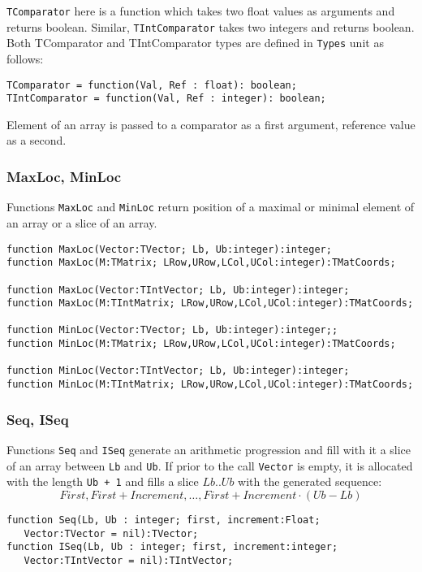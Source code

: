 \documentclass[12pt,a4paper,oneside]{article}
\newcommand{\code}[1]{\texttt{#1}}
\begin{document}
\code{TComparator} here is a function which takes two float values as arguments and returns boolean. Similar, \code{TIntComparator} takes two integers and returns boolean. Both TComparator and TIntComparator types are defined in \code{Types} unit as follows:
\begin{verbatim}
TComparator = function(Val, Ref : float): boolean;
TIntComparator = function(Val, Ref : integer): boolean;
\end{verbatim}
Element of an array is passed to a comparator as a first argument, reference value as a second.
\subsubsection{MaxLoc, MinLoc}
Functions \code{MaxLoc} and \code{MinLoc} return position of a maximal or minimal element of an array or a slice of an array.
\begin{verbatim}
function MaxLoc(Vector:TVector; Lb, Ub:integer):integer;
function MaxLoc(M:TMatrix; LRow,URow,LCol,UCol:integer):TMatCoords;

function MaxLoc(Vector:TIntVector; Lb, Ub:integer):integer;
function MaxLoc(M:TIntMatrix; LRow,URow,LCol,UCol:integer):TMatCoords;

function MinLoc(Vector:TVector; Lb, Ub:integer):integer;;
function MinLoc(M:TMatrix; LRow,URow,LCol,UCol:integer):TMatCoords;

function MinLoc(Vector:TIntVector; Lb, Ub:integer):integer;
function MinLoc(M:TIntMatrix; LRow,URow,LCol,UCol:integer):TMatCoords;
\end{verbatim}
\subsubsection{Seq, ISeq}
Functions \code{Seq} and \code{ISeq} generate an arithmetic progression and fill with it a slice of an array between \code{Lb} and \code{Ub}. If prior to the call \code{Vector} is empty, it is allocated with the length \code{Ub + 1} and fills a slice $Lb..Ub$ with the generated sequence:
$$
 First, First + Increment, \dots, First + Increment \cdot (Ub-Lb)  
$$
\begin{verbatim}
function Seq(Lb, Ub : integer; first, increment:Float; 
   Vector:TVector = nil):TVector;
function ISeq(Lb, Ub : integer; first, increment:integer; 
   Vector:TIntVector = nil):TIntVector;
\end{verbatim}
\end{document}
